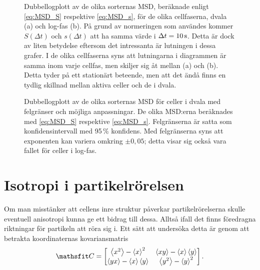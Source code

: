 \begin{figure}\centerline{
\subfigure[][]{}
\subfigure[][]{}
}
\caption{Dubbellogplott av de olika sorternas MSD, beräknade enligt \eqref{eq:MSD_S} respektive \eqref{eq:MSD_s}, för de olika cellfaserna, dvala (a) och log-fas (b). På grund av normeringen som användes kommer $S(\Delta{t})$ och $s(\Delta{t})$ att ha samma värde i $\Delta{t}=\unit[10]{s}$. Detta är dock av liten betydelse eftersom det intressanta är lutningen i dessa grafer. I de olika cellfaserna syns att lutningarna i diagrammen är samma inom varje cellfas, men skiljer sig åt mellan (a) och (b). Detta tyder på ett stationärt beteende, men att det ändå finns en tydlig skillnad mellan aktiva celler och de i dvala. %
}
\label{fig:MSD}
\end{figure}
\begin{figure}\centerline{
\subfigure[][]{

}
\subfigure[][]{

}}
\caption{Dubbellogplott av de olika sorternas MSD för celler i dvala med felgränser och möjliga anpassningar. De olika MSD:erna beräknades med \eqref{eq:MSD_S} respektive \eqref{eq:MSD_s}. Felgränserna är satta som konfidensintervall med 95\,\% konfidens. Med felgränserna syns att exponenten kan variera omkring $\pm 0,05$; detta visar sig också vara fallet för celler i log-fas.}
\label{fig:MSD_error}
\end{figure}
\restoregeometry%




\section{Isotropi i partikelrörelsen} \label{sec:isotropi}
Om man misstänker att cellens inre struktur påverkar partikelrörelserna skulle eventuell anisotropi kunna ge ett bidrag till dessa. Alltså ifall det finns föredragna riktningar för partikeln att röra sig i. Ett sätt att undersöka detta är genom att betrakta koordinaternas kovariansmatris
\begin{equation}\label{eq:C_matris}
\mathsf{C}=
\begin{bmatrix} 
\ev{x^2}-\ev{x}^2 & \ev{xy}-\ev{x}\ev{y}\\
\ev{yx}-\ev{x}\ev{y} & \ev{y^2}-\ev{y}^2
\end{bmatrix}.
\end{equation}

